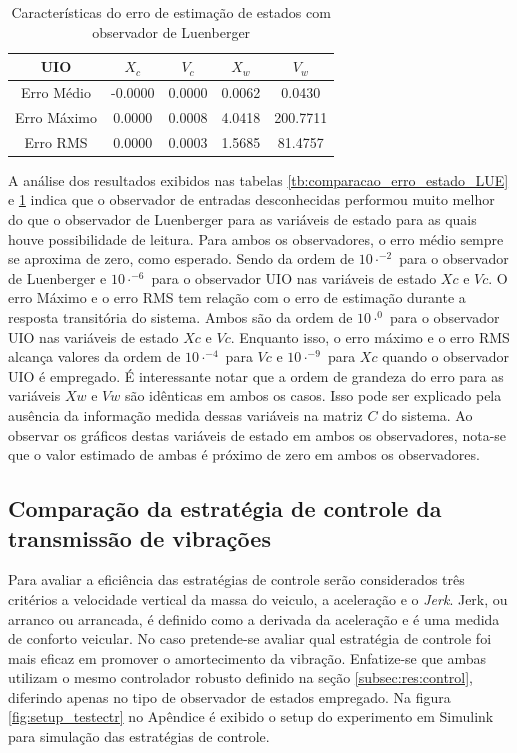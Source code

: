 \begin{table}[h!]
\footnotesize
\centering
    \begin{tabular}{|c|c|c|c|c|}
        \hline
        UIO & $X_c$& $V_c$& $X_w$& $V_w$\\
        \hline
        \hline
         Erro Médio& -0.0000& 0.0000& 0.0062&   0.0430\\ 
         Erro Máximo& 0.0000& 0.0008& 4.0418& 200.7711\\ 
         Erro RMS&    0.0000& 0.0003& 1.5685&  81.4757\\
        \hline
    \end{tabular} \label{tb:comparacao_erro_estados_UIO}\caption{Características do erro de estimação de estados com observador de Luenberger}
\end{table}

A análise dos resultados exibidos nas tabelas \ref{tb:comparacao_erro_estado_LUE} e \ref{tb:comparacao_erro_estados_UIO} indica que o observador de entradas desconhecidas performou muito melhor do que o observador de Luenberger para as variáveis de estado para as quais houve possibilidade de leitura. Para ambos os observadores, o erro médio sempre se aproxima de zero, como esperado. Sendo da ordem de $10\cdot^{-2}$ para o observador de Luenberger e $10\cdot^{-6}$ para o observador UIO nas variáveis de estado $Xc$ e $Vc$. O erro Máximo e o erro RMS tem relação com o erro de estimação durante a resposta transitória do sistema. Ambos são da ordem de $10\cdot^{0}$ para o observador UIO nas variáveis de estado $Xc$ e $Vc$. Enquanto isso, o erro máximo e o erro RMS alcança valores da ordem de $10\cdot^{-4}$ para $Vc$ e $10\cdot^{-9}$ para $Xc$ quando o observador UIO é empregado.
É interessante notar que a ordem de grandeza do erro para as variáveis $Xw$ e $Vw$ são idênticas em ambos os casos. Isso pode ser explicado pela ausência da informação medida dessas variáveis na matriz $C$ do sistema. Ao observar os gráficos destas variáveis de estado em ambos os observadores, nota-se que o valor estimado de ambas é próximo de zero em ambos os observadores.

\subsection{Comparação da estratégia de controle da transmissão de vibrações}
Para avaliar a eficiência das estratégias de controle serão considerados três critérios a velocidade vertical da massa do veiculo, a aceleração e o \emph{Jerk}. Jerk, ou arranco ou arrancada, é definido como a derivada da aceleração e é uma medida de conforto veicular. No caso pretende-se avaliar qual estratégia de controle foi mais eficaz em promover o amortecimento da vibração. Enfatize-se que ambas utilizam o mesmo controlador robusto definido na seção \ref{subsec:res:control}, diferindo apenas no tipo de observador de estados empregado.
Na figura \ref{fig:setup_testectr} no Apêndice é exibido o setup do experimento em Simulink para simulação das estratégias de controle.

